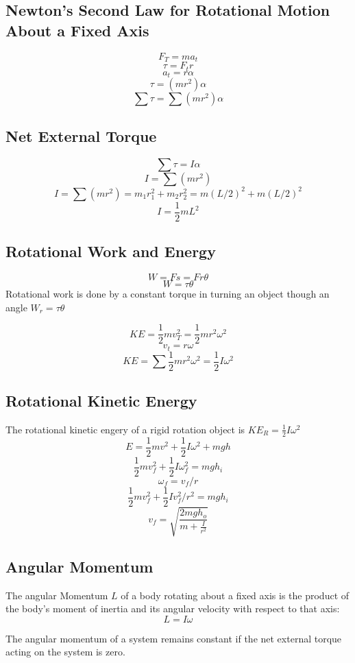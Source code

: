 \subsection{Newton’s Second Law for Rotational Motion About a Fixed Axis}
\[F_T=ma_t\]
\[\tau=F_tr\]
\[a_t=r\alpha\]
\[\tau=(mr^2)\alpha\]
\[\sum\tau=\sum(mr^2)\alpha\]

\subsection{Net External Torque}
\[\sum\tau=I\alpha\]
\[I=\sum(mr^2)\]
\[I=\sum(mr^2)=m_1r_1^2+m_2r_2^2=m(L/2)^2+m(L/2)^2\]
\[I=\frac{1}{2}mL^2\]

\subsection{Rotational Work and Energy}
\[W=Fs=Fr\theta\]
\[W=\tau\theta\]
Rotational work is done by a constant torque in turning an object though an angle $W_r=\tau\theta$

\[KE=\frac{1}{2}mv_T^2=\frac{1}{2}mr^2\omega^2\]
\[v_t=r\omega\]
\[KE=\sum\frac{1}{2}mr^2\omega^2=\frac{1}{2}I\omega^2\]

\subsection{Rotational Kinetic Energy}
The rotational kinetic engery of a rigid rotation object is $KE_R=\frac{1}{2}I\omega^2$
\[E=\frac{1}{2}mv^2+\frac{1}{2}I\omega^2+mgh\]
\[\frac{1}{2}mv_f^2+\frac{1}{2}I\omega^2_f=mgh_i\]
\[\omega _f=v_f/r\]
\[\frac{1}{2}mv^2_f+\frac{1}{2}Iv^2_f/r^2=mgh_i\]
\[v_f=\sqrt{\frac{2mgh_o}{m+\frac{I}{r^2}}}\]

\subsection{Angular Momentum}
The angular Momentum $L$ of a body rotating about a fixed axis is the product of the body's moment of inertia and its angular velocity with respect to that axis: \[L=I\omega\]

The angular momentum of a system remains constant if the net external torque acting on the system is zero.